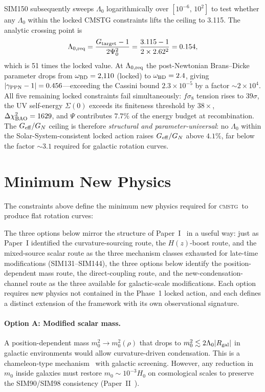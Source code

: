 \documentclass[12pt,a4paper]{article}
\newcommand{\CMSTG}{\textsc{cmstg}}
\newcommand{\Lz}{\Lambda_0}
\newcommand{\Geff}{G_{\rm eff}}
\theoremstyle{plain}
\begin{document}
SIM150 subsequently sweeps $\Lz$ logarithmically over $[10^{-6},\,10^2]$ to
test whether any $\Lz$ within the locked CMSTG constraints lifts the ceiling
to 3.115. The analytic crossing point is
\begin{equation}
  \Lambda_{0,{\rm req}} = \frac{G_{\rm target}-1}{2\Psi_0^2} = \frac{3.115-1}{2\times2.62^2} = 0.154,
\end{equation}
which is 51 times the locked value. At $\Lambda_{0,{\rm req}}$ the post-Newtonian
Brans--Dicke parameter drops from $\omega_{\rm BD}=2{,}110$ (locked) to
$\omega_{\rm BD}=2.4$, giving $|\gamma_{\rm PPN}-1| = 0.456$---exceeding the
Cassini bound $2.3\times10^{-5}$ by a factor $\sim2\times10^4$. All five
remaining locked constraints fail simultaneously: $f\sigma_8$ tension rises to
$39\sigma$, the UV self-energy $\Sigma(0)$ exceeds its finiteness threshold by
$38\times$, $\Delta\chi^2_{\rm BAO} = 1629$, and $\Psi$ contributes $7.7\%$
of the energy budget at recombination. The $\Geff/G_N$ ceiling is therefore
\emph{structural and parameter-universal}: no $\Lz$ within the Solar-System-consistent
locked action raises $\Geff/G_N$ above $4.1\%$, far below the factor $\sim3.1$
required for galactic rotation curves.

\section{Minimum New Physics}
\label{sec:minimum-physics}

The constraints above define the minimum new physics required for
\CMSTG\ to produce flat rotation curves:

The three options below mirror the structure of Paper~I~\cite{WilsonPaperI}
in a useful way: just as Paper~I identified the curvature-sourcing route, the $H(z)$-boost route,
and the mixed-source scalar route as the three mechanism classes exhausted for
late-time modifications (SIM131--SIM144), the three options below identify the position-dependent mass
route, the direct-coupling route, and the new-condensation-channel route as the
three available for galactic-scale modifications. Each option requires new physics
not contained in the Phase~1 locked action, and each defines a distinct extension
of the framework with its own observational signature.

\paragraph{Option A: Modified scalar mass.}
A position-dependent mass $m_0^2 \to m_0^2(\rho)$ that drops to
$m_0^2 \lesssim 2\Lz|R_{\rm gal}|$ in galactic environments would allow
curvature-driven condensation. This is a chameleon-type mechanism~\cite{Khoury2004}
with galactic screening. However, any reduction in $m_0$ inside galaxies
must restore $m_0 \sim 10^{-3}H_0$ on cosmological scales to preserve
the SIM90/SIM98 consistency (Paper~II~\cite{WilsonPaperII}).
\end{document}
